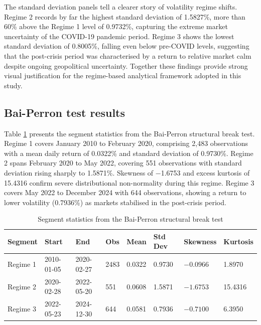 The standard deviation panels tell a clearer story of volatility regime shifts. Regime 2 records by far the highest standard deviation of 1.5827\%, more than 60\% above the Regime 1 level of 0.9732\%, capturing the extreme market uncertainty of the COVID-19 pandemic period. Regime 3 shows the lowest standard deviation of 0.8005\%, falling even below pre-COVID levels, suggesting that the post-crisis period was characterised by a return to relative market calm despite ongoing geopolitical uncertainty. Together these findings provide strong visual justification for the regime-based analytical framework adopted in this study.








\subsection{Bai-Perron test results}


Table \ref{bai disc stat} presents the segment statistics from the Bai-Perron structural break test. Regime 1 covers January 2010 to February 2020, comprising 2,483 observations with a mean daily return of 0.0322\% and standard deviation of 0.9730\%.  Regime 2 spans February 2020 to May 2022, covering 551 observations with standard deviation rising sharply to 1.5871\%. Skewness of −1.6753 and excess kurtosis of 15.4316 confirm severe distributional non-normality during this regime. Regime 3 covers May 2022 to December 2024 with 644 observations, showing a return to lower volatility (0.7936\%) as markets stabilised in the post-crisis period.


\begin{table}[H]
\centering
\caption{ Segment statistics from the Bai-Perron structural break test}
\label{bai disc stat}
\begin{tabular}{|l|l|l|l|l|l|l|l|}
\hline
\textbf{Segment} & \textbf{Start} & \textbf{End} & \textbf{Obs} & \textbf{Mean} & \textbf{Std Dev} & \textbf{Skewness} & \textbf{Kurtosis} \\
\hline
Regime 1 & 2010-01-05 & 2020-02-27 & 2483 & 0.0322  & 0.9730 & $-0.0966$ & 1.8970  \\
\hline
Regime 2 & 2020-02-28 & 2022-05-20 & 551  & 0.0608  & 1.5871 & $-1.6753$ & 15.4316 \\
\hline
Regime 3 & 2022-05-23 & 2024-12-30 & 644  & 0.0581  & 0.7936 & $-0.7100$ & 6.3950  \\
\hline
\end{tabular}
\end{table}



